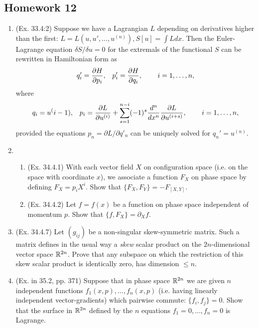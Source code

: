 \subsection{Homework 12}
\begin{enumerate}
	\item (Ex. 33.4:2) Suppose we have a Lagrangian $L$ depending on derivatives higher than the first: $ L = L(u, u', \dots, u^{(n)}), S[u] = \int Ldx. $ Then the Euler-Lagrange equation $\delta S/\delta u = 0$ for the extremals of the functional $S$ can be rewritten in Hamiltonian form as
	\begin{eqnarray}
		q'_i = \pardiff{H}{p_i}, && p'_i = \pardiff{H}{q_i}, \hspace{0.3 in} \hbox{$i = 1, \dots, n,$}
		\nonumber
	\end{eqnarray}
	where
	\begin{eqnarray}
		q_i = u^(i-1), && p_i = \pardiff{L}{u^{(i)}} + \sum_{s = 1}^{n - i} (-1)^s \diff[n]{ }{x} \pardiff{L}{u^{(i+s)}}, \hspace{0.3 in} \hbox{$i = 1, \dots, n,$}
		\nonumber
	\end{eqnarray}
	provided the equations $p_n = \partial L/\partial q'_n$ can be uniquely solved for $q_n' = u^{(n)}$.
	
	\item
	\begin{enumerate}
		\item (Ex. 34.4.1) With each vector field $X$ on configuration space (i.e. on the space with coordinate $x$), we associate a function $F_X$ on phase space by defining $F_X = p_i X^i$. Show that $\{F_X, F_Y\} = -F_{[X, Y]}$.
		\item (Ex. 34.4.2) Let $f = f(x)$ be a function on phase space independent of momentum $p$. Show that $\{ f, F_X \} = \partial_X f$.
	\end{enumerate}

	\item (Ex. 34.4.7) Let $(g_{ij})$ be a non-singular skew-symmetric matrix. Such a matrix defines in the usual way a \emph{skew} scalar product on the $2n$-dimensional vector space $\R^{2n}$. Prove that any subspace on which the restriction of this skew scalar product is identically zero, has dimension $\leq n$.
	
	\item (Ex. in 35.2, pp. 371) Suppose that in phase space $\R^{2n}$ we are given $n$ independent functions $f_1(x, p), \dots, f_n(x, p)$ (i.e. having linearly independent vector-gradients) which pairwise commute: $\{f_i, f_j\} = 0$. Show that the surface in $\R^{2n}$ defined by the $n$ equations $f_1 = 0, \dots, f_n = 0$ is Lagrange.
\end{enumerate}
